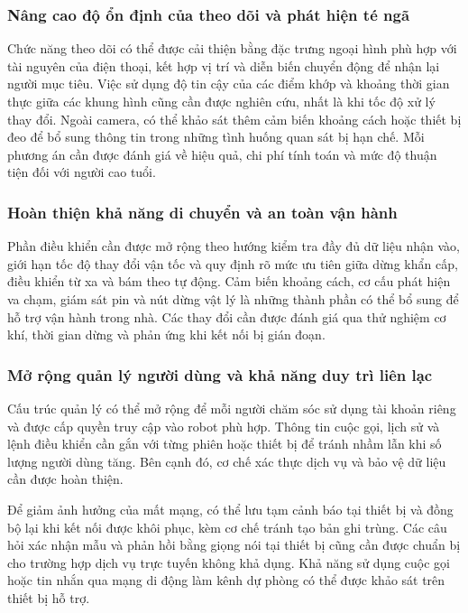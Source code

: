 \subsubsection{Nâng cao độ ổn định của theo dõi và phát hiện té ngã}

Chức năng theo dõi có thể được cải thiện bằng đặc trưng ngoại hình phù hợp với tài nguyên của điện thoại, kết hợp vị trí và diễn biến chuyển động để nhận lại người mục tiêu. Việc sử dụng độ tin cậy của các điểm khớp và khoảng thời gian thực giữa các khung hình cũng cần được nghiên cứu, nhất là khi tốc độ xử lý thay đổi. Ngoài camera, có thể khảo sát thêm cảm biến khoảng cách hoặc thiết bị đeo để bổ sung thông tin trong những tình huống quan sát bị hạn chế. Mỗi phương án cần được đánh giá về hiệu quả, chi phí tính toán và mức độ thuận tiện đối với người cao tuổi.

\subsubsection{Hoàn thiện khả năng di chuyển và an toàn vận hành}

Phần điều khiển cần được mở rộng theo hướng kiểm tra đầy đủ dữ liệu nhận vào, giới hạn tốc độ thay đổi vận tốc và quy định rõ mức ưu tiên giữa dừng khẩn cấp, điều khiển từ xa và bám theo tự động. Cảm biến khoảng cách, cơ cấu phát hiện va chạm, giám sát pin và nút dừng vật lý là những thành phần có thể bổ sung để hỗ trợ vận hành trong nhà. Các thay đổi cần được đánh giá qua thử nghiệm cơ khí, thời gian dừng và phản ứng khi kết nối bị gián đoạn.

\subsubsection{Mở rộng quản lý người dùng và khả năng duy trì liên lạc}

Cấu trúc quản lý có thể mở rộng để mỗi người chăm sóc sử dụng tài khoản riêng và được cấp quyền truy cập vào robot phù hợp. Thông tin cuộc gọi, lịch sử và lệnh điều khiển cần gắn với từng phiên hoặc thiết bị để tránh nhầm lẫn khi số lượng người dùng tăng. Bên cạnh đó, cơ chế xác thực dịch vụ và bảo vệ dữ liệu cần được hoàn thiện.

Để giảm ảnh hưởng của mất mạng, có thể lưu tạm cảnh báo tại thiết bị và đồng bộ lại khi kết nối được khôi phục, kèm cơ chế tránh tạo bản ghi trùng. Các câu hỏi xác nhận mẫu và phản hồi bằng giọng nói tại thiết bị cũng cần được chuẩn bị cho trường hợp dịch vụ trực tuyến không khả dụng. Khả năng sử dụng cuộc gọi hoặc tin nhắn qua mạng di động làm kênh dự phòng có thể được khảo sát trên thiết bị hỗ trợ.

